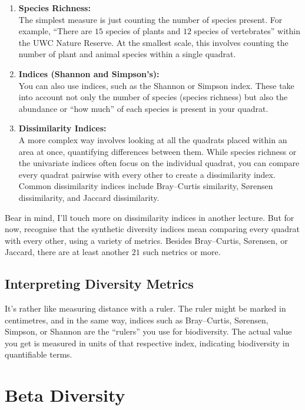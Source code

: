 \documentclass[
  12pt,
]{book}
\begin{document}
\begin{enumerate}
\def\labelenumi{\arabic{enumi}.}
\item
  \textbf{Species Richness:}\\
  The simplest measure is just counting the number of species present.
  For example, ``There are \(15\) species of plants and \(12\) species
  of vertebrates'' within the UWC Nature Reserve. At the smallest scale,
  this involves counting the number of plant and animal species within a
  single quadrat.
\item
  \textbf{Indices (Shannon and Simpson's):}\\
  You can also use indices, such as the Shannon or Simpson index. These
  take into account not only the number of species (species richness)
  but also the abundance or ``how much'' of each species is present in
  your quadrat.
\item
  \textbf{Dissimilarity Indices:}\\
  A more complex way involves looking at all the quadrats placed within
  an area at once, quantifying differences between them. While species
  richness or the univariate indices often focus on the individual
  quadrat, you can compare every quadrat pairwise with every other to
  create a dissimilarity index. Common dissimilarity indices include
  Bray--Curtis similarity, Sørensen dissimilarity, and Jaccard
  dissimilarity.
\end{enumerate}

Bear in mind, I'll touch more on dissimilarity indices in another
lecture. But for now, recognise that the synthetic diversity indices
mean comparing every quadrat with every other, using a variety of
metrics. Besides Bray--Curtis, Sørensen, or Jaccard, there are at least
another \(21\) such metrics or more.

\subsection{Interpreting Diversity
Metrics}\label{interpreting-diversity-metrics}

It's rather like measuring distance with a ruler. The ruler might be
marked in centimetres, and in the same way, indices such as
Bray--Curtis, Sørensen, Simpson, or Shannon are the ``rulers'' you use
for biodiversity. The actual value you get is measured in units of that
respective index, indicating biodiversity in quantifiable terms.

\section{Beta Diversity}\label{beta-diversity}
\end{document}
